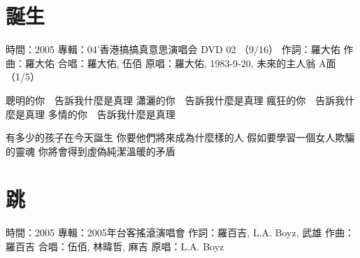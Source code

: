 \documentclass[UTF8,a4paper,oneside,twocolumn,12pt]{ctexbook}
\newcommand{\infopair}[2]{\textbullet #1：#2}
\newcommand{\zc}[1][伍佰]{\infopair{作詞}{#1}}
\newcommand{\zq}[1][伍佰]{\infopair{作曲}{#1}}
\newcommand{\zj}[1]{\infopair{專輯}{#1}}
\newcommand{\yc}[1]{\infopair{原唱}{#1}}
\newcommand{\sj}[1]{\infopair{時間}{#1}}
\newenvironment{info}{\begin{flushleft}\kaishu
	}
	{\end{flushleft}\normalsize\yahei\par}
\newenvironment{lyric}{
	}
{}
\begin{document}
\section{誕生}
\begin{info}
	\sj{2005}
	\zj{04'香港搞搞真意思演唱会 DVD 02 （9/16）}
	\zc[羅大佑]
	\zq[羅大佑]
	\infopair{合唱}{羅大佑, 伍佰}
	\yc{羅大佑, 1983-9-20, 未來的主人翁 A面（1/5）}
\end{info}
\begin{lyric}
	聰明的你　告訴我什麼是真理
	瀟灑的你　告訴我什麼是真理
	瘋狂的你　告訴我什麼是真理
	多情的你　告訴我什麼是真理

	有多少的孩子在今天誕生
	你要他們將來成為什麼樣的人
	假如要學習一個女人欺騙的靈魂
	你將會得到虛偽純潔溫暖的矛盾
\end{lyric}

\section{跳}
\begin{info}
	\sj{2005}
	\zj{2005年台客搖滾演唱會}
	\zc[羅百吉, L.A. Boyz, 武雄]
	\zq[羅百吉]
	\infopair{合唱}{伍佰, 林暐哲, 麻吉}
	\yc{L.A. Boyz}
\end{info}
\end{document}
